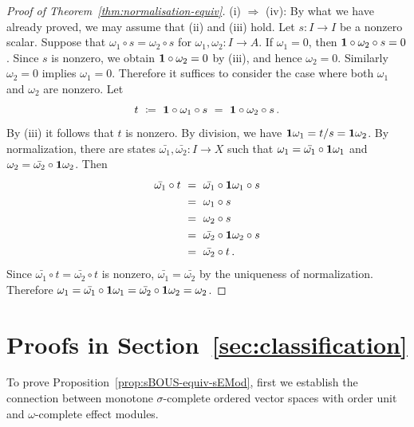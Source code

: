 \documentclass[%
	submission,
copyright,creativecommons,UKenglish]{eptcs}
\begin{document}
\begin{proof}[Proof of Theorem~\ref{thm:normalisation-equiv}]
(i) $\Longrightarrow$ (iv):
By what we have already proved,
we may assume that (ii) and (iii) hold.
Let $s\colon I\to I$ be a nonzero scalar.
Suppose that $\omega_1\circ s=\omega_2\circ s$
for $\omega_1,\omega_2\colon I\to A$.
If $\omega_1=0$, then
$\mathbf{1}\circ\omega_2\circ s=0$.
Since $s$ is nonzero, we obtain $\mathbf{1}\circ\omega_2=0$
by (iii), and hence $\omega_2=0$.
Similarly $\omega_2=0$ implies $\omega_1=0$.
Therefore it suffices to consider the case where
both $\omega_1$ and $\omega_2$ are nonzero.
Let
\[
t\ \coloneqq\  \mathbf{1}\circ \omega_1\circ s\ =\ \mathbf{1}\circ\omega_2\circ s
\,\text{.}
\]
By (iii) it follows that $t$ is nonzero.
By division,
we have $\mathbf{1} \omega_1=t/s = \mathbf{1} \omega_2$.
By normalization,
there are states $\bar{\omega_1},\bar{\omega_2}\colon I\to X$
such that
$\omega_1=\bar{\omega_1}\circ\mathbf{1} \omega_1$
and $\omega_2=\bar{\omega_2}\circ\mathbf{1} \omega_2$.
Then
\begin{align*}
\bar{\omega_1}\circ t
&\ =\  \bar{\omega_1}\circ \mathbf{1} \omega_1\circ s \\
&\ =\  \omega_1\circ s \\
&\ =\  \omega_2\circ s \\
&\ =\  \bar{\omega_2}\circ \mathbf{1} \omega_2\circ s \\
&\ =\  \bar{\omega_2}\circ t
\,\text{.}
\end{align*}
Since
$\bar{\omega_1}\circ t=\bar{\omega_2}\circ t$
is nonzero,
$\bar{\omega_1}=\bar{\omega_2}$
by the uniqueness of normalization.
Therefore $\omega_1=\bar{\omega_1}\circ\mathbf{1} \omega_1=\bar{\omega_2}\circ \mathbf{1} \omega_2=\omega_2$.
\end{proof}


\section{Proofs in Section~\ref{sec:classification}}
\label{app:convex-proofs}

To prove Proposition~\ref{prop:sBOUS-equiv-sEMod},
first we establish the connection between
monotone $\sigma$-complete
ordered vector spaces
with order unit
and $\omega$-complete effect modules.
\end{document}
